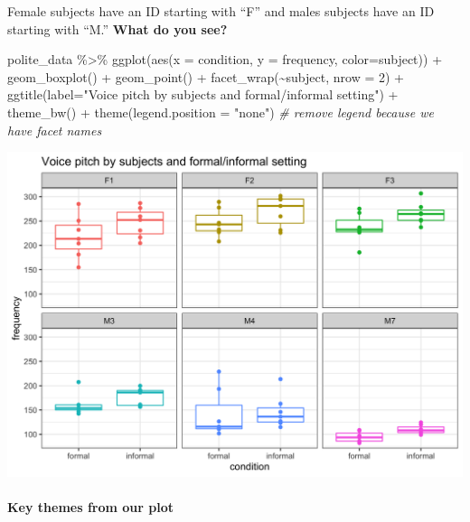 \documentclass[
  openany]{book}
\newenvironment{Shaded}{\begin{snugshade}}{\end{snugshade}}
\newcommand{\AttributeTok}[1]{\textcolor[rgb]{0.77,0.63,0.00}{#1}}
\newcommand{\CommentTok}[1]{\textcolor[rgb]{0.56,0.35,0.01}{\textit{#1}}}
\newcommand{\DecValTok}[1]{\textcolor[rgb]{0.00,0.00,0.81}{#1}}
\newcommand{\FunctionTok}[1]{\textcolor[rgb]{0.00,0.00,0.00}{#1}}
\newcommand{\NormalTok}[1]{#1}
\newcommand{\SpecialCharTok}[1]{\textcolor[rgb]{0.00,0.00,0.00}{#1}}
\newcommand{\StringTok}[1]{\textcolor[rgb]{0.31,0.60,0.02}{#1}}
\begin{document}
Female subjects have an ID starting with ``F'' and males subjects have an ID starting with ``M.'' \textbf{What do you see?}

\begin{Shaded}
\begin{Highlighting}[]
\NormalTok{polite\_data }\SpecialCharTok{\%\textgreater{}\%} 
  \FunctionTok{ggplot}\NormalTok{(}\FunctionTok{aes}\NormalTok{(}\AttributeTok{x =}\NormalTok{ condition, }
             \AttributeTok{y =}\NormalTok{ frequency,}
             \AttributeTok{color=}\NormalTok{subject)) }\SpecialCharTok{+}
  \FunctionTok{geom\_boxplot}\NormalTok{() }\SpecialCharTok{+} 
  \FunctionTok{geom\_point}\NormalTok{() }\SpecialCharTok{+}
  \FunctionTok{facet\_wrap}\NormalTok{(}\SpecialCharTok{\textasciitilde{}}\NormalTok{subject, }\AttributeTok{nrow =} \DecValTok{2}\NormalTok{) }\SpecialCharTok{+}
  \FunctionTok{ggtitle}\NormalTok{(}\AttributeTok{label=}\StringTok{"Voice pitch by subjects and formal/informal setting"}\NormalTok{) }\SpecialCharTok{+}
  \FunctionTok{theme\_bw}\NormalTok{() }\SpecialCharTok{+}
  \FunctionTok{theme}\NormalTok{(}\AttributeTok{legend.position =} \StringTok{"none"}\NormalTok{) }\CommentTok{\# remove legend because we have facet names}
\end{Highlighting}
\end{Shaded}

\includegraphics[width=1\linewidth]{images/m3/explore}

\hypertarget{key-themes-from-our-plot}{%
\paragraph{Key themes from our plot}\label{key-themes-from-our-plot}}
\end{document}
